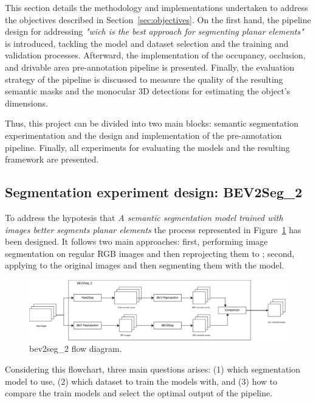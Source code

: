 This section details the methodology and implementations undertaken to address the objectives described in Section~\ref{sec:objectives}. On the first hand, the pipeline design for addressing \textit{"wich is the best approach for segmenting planar elements"} is introduced, tackling the model and dataset selection and the training and validation processes. Afterward, the implementation of the occupancy, occlusion, and drivable area pre-annotation pipeline is presented. Finally, the evaluation strategy of the pipeline is discussed to measure the quality of the resulting semantic masks and the monocular 3D detections for estimating the object's dimensions.

Thus, this project can be divided into two main blocks:  semantic segmentation experimentation and the design and implementation of the pre-annotation pipeline. Finally, all experiments for evaluating the models and the resulting framework are presented.  

\subsection{Segmentation experiment design: BEV2Seg\_2} \label{sec:bev2seg_2}

To address the hypotesis that \textit{A semantic segmentation model trained with  images better segments planar elements} the process represented in Figure~\ref{fig:beg2seg_2_flow} has been designed. It follows two main approaches: first, performing image segmentation on regular RGB images and then reprojecting them to ; second, applying  to the original images and then segmenting them with the model.

\begin{figure}[h!]
    \centering
    \includegraphics[width=\linewidth]{./images/methodology/bev2seg_2_flow.png}
    \caption{bev2seg\_2 flow diagram.}
    \label{fig:beg2seg_2_flow}
\end{figure}

Considering this flowchart, three main questions arises: (1) which segmentation model to use, (2) which dataset to train the models with, and (3) how to compare the train models and select the optimal output of the pipeline. 

